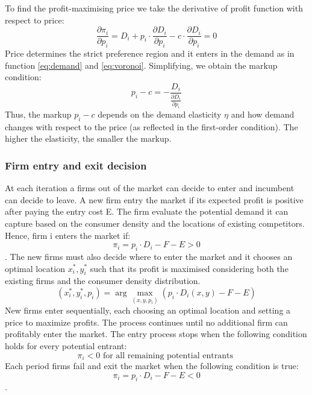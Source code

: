 To find the profit-maximising price we take the derivative of profit function with respect to price:
\begin{equation}
\frac{\partial \pi_i}{\partial p_i}=D_i+p_i \cdot \frac{\partial D_i}{\partial p_i}-c \cdot \frac{\partial D_i}{\partial p_i}=0
\end{equation}
Price determines the strict preference region and it enters in the demand as in function \ref{eq:demand} and \ref{eq:voronoi}.
Simplifying, we obtain the markup condition:
\begin{equation}
p_i-c=-\frac{D_i}{\frac{\partial D_i}{\partial p_i}}
\end{equation}
Thus, the markup $p_i-c$ depends on the demand elasticity 
$\eta$ and how demand changes with respect to the price (as reflected in the first-order condition). The higher the elasticity, the smaller the markup.
\subsubsection*{Firm entry and exit decision}
At each iteration a firms out of the market can decide to enter and incumbent can decide to leave.
A new firm entry the market if its expected profit is positive after paying the entry cost E. The firm evaluate the potential demand it can capture based on the consumer density and the locations of existing competitors. Hence, firm i enters the market if:
\begin{equation}
\pi_i=p_i \cdot D_i-F-E>0
\end{equation}.
The new firms must also decide where to enter the market and it chooses an optimal location $x_i^*,y_i^*$ such that its profit is maximised considering both the existing firms and the consumer density distribution.
\begin{equation}
\left(x_i^*, y_i^*, p_i\right)=\arg \max _{(x, y, p_i)}\left(p_i \cdot D_i(x, y)-F-E\right)
\end{equation}
New firms enter sequentially, each choosing an optimal location and setting a price to maximize profits. The process continues until no additional firm can profitably enter the market. The entry process stops when the following condition holds for every potential entrant:
$$
\pi_i<0 \text { for all remaining potential entrants }
$$
Each period firms fail and exit the market when the following condition is true:
\begin{equation}
\pi_i=p_i \cdot D_i-F-E<0
\end{equation}.
